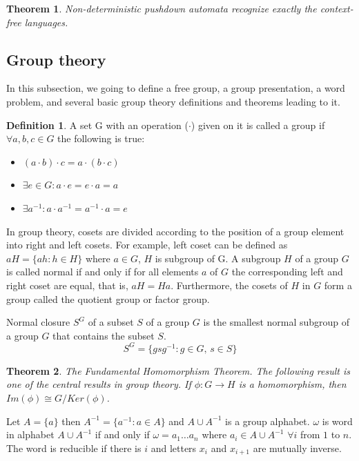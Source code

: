 \documentclass[conference]{IEEEtran}
\newtheorem{thm}{Theorem}[section]
\theoremstyle{definition}
\newtheorem{defn}{Definition}[section]
\begin{document}
\begin{thm} \label{thmpda}
Non-deterministic pushdown automata recognize exactly the context-free languages.
\end{thm}

\subsection{Group theory}

In this subsection, we going to define a free group, a group presentation,
a word problem, and several basic group theory definitions and theorems leading to it. 

\begin{defn}
A set G with an operation ($\cdot$) given on it is called a group if $\forall a, b, c \in G$ 
the following is true:
\begin{itemize}
\item $(a \cdot b) \cdot c = a \cdot (b \cdot c)$
\item $\exists e \in G : a \cdot e = e \cdot a = a$
\item $\exists a^{-1} : a \cdot a^{-1} = a^{-1} \cdot a = e$
\end{itemize}
\end{defn}

In group theory, cosets are divided according to the position of a group element 
into right and left cosets. For example, left coset can be defined as $aH = \{ ah : h \in H \}$
where $a \in G$, $H$ is subgroup of G.
A subgroup $H$ of a group $G$ is called normal if and only if for all 
elements $a$ of $G$ the corresponding left and right coset are equal, 
that is, $aH= Ha$. Furthermore, the cosets of $H$ in $G$ form a group 
called the quotient group or factor group. 

Normal closure $S^G$ of a subset $S$ of a group $G$ is the smallest normal subgroup 
of a group $G$ that contains the subset $S$.
\begin{equation}
    S^G = \{ gsg^{-1} : g \in G,\, s \in S \}
\end{equation}

\begin{thm}
The Fundamental Homomorphism Theorem.
The following result is one of the central results in group theory. 
If $\phi: G \to H$ is a homomorphism, then $Im(\phi) \cong G/Ker(\phi)$.
\end{thm}

Let $A = \{ a \}$ then $A^{-1} = \{ a^{-1} : a \in A \}$ and $A \cup A^{-1}$ is a group alphabet.
$\omega$ is word in alphabet $A \cup A^{-1}$ if and only if $\omega = a_1 \dots a_n$ 
where $a_i \in A \cup A^{-1}$ $\forall i$ from $1$ to $n$. 
The word is reducible if there is $i$ and letters $x_i$ and $x_{i+1}$ are mutually inverse. 
\end{document}
